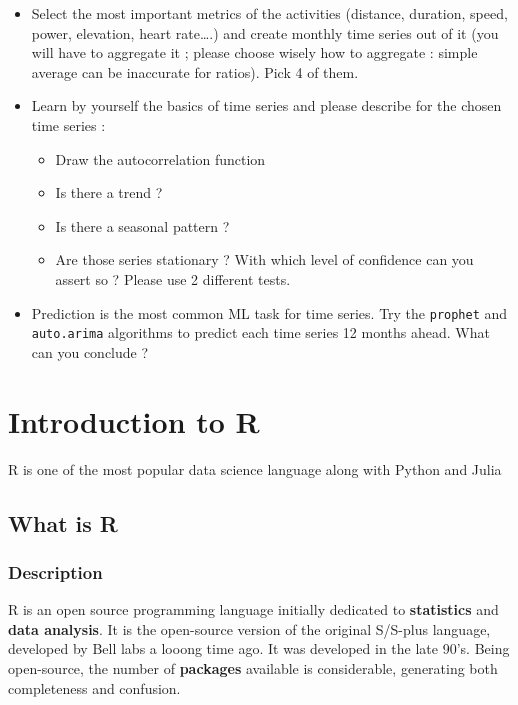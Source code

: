 \documentclass[
]{book}
\providecommand{\tightlist}{%
  \setlength{\itemsep}{0pt}\setlength{\parskip}{0pt}}
\begin{document}
\begin{itemize}
\tightlist
\item
  Select the most important metrics of the activities (distance, duration, speed, power, elevation, heart rate\ldots.) and create monthly time series out of it (you will have to aggregate it ; please choose wisely how to aggregate : simple average can be inaccurate for ratios). Pick 4 of them.
\item
  Learn by yourself the basics of time series and please describe for the chosen time series :

  \begin{itemize}
  \tightlist
  \item
    Draw the autocorrelation function
  \item
    Is there a trend ?
  \item
    Is there a seasonal pattern ?
  \item
    Are those series stationary ? With which level of confidence can you assert so ? Please use 2 different tests.
  \end{itemize}
\item
  Prediction is the most common ML task for time series. Try the \texttt{prophet} and \texttt{auto.arima} algorithms to predict each time series 12 months ahead. What can you conclude ?
\end{itemize}

\hypertarget{intro_r}{%
\chapter{Introduction to R}\label{intro_r}}

R is one of the most popular data science language along with Python and Julia

\hypertarget{what-is-r}{%
\section{What is R}\label{what-is-r}}

\hypertarget{description}{%
\subsection{Description}\label{description}}

R is an open source programming language initially dedicated to \textbf{statistics} and \textbf{data analysis}. It is the open-source version of the original S/S-plus language, developed by Bell labs a looong time ago. It was developed in the late 90's. Being open-source, the number of \textbf{packages} available is considerable, generating both completeness and confusion.
\end{document}
